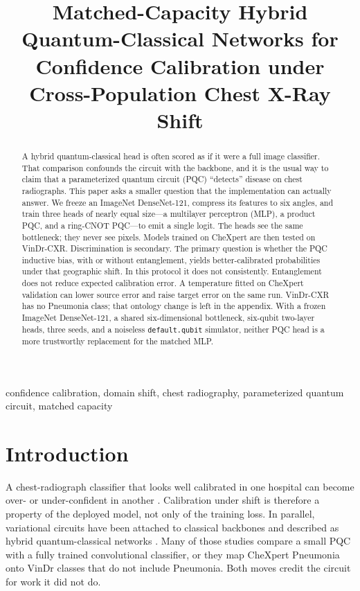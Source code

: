 \documentclass{midl} %
\title[Matched-capacity PQC heads under CXR shift]{Matched-Capacity Hybrid Quantum-Classical Networks for Confidence Calibration under Cross-Population Chest X-Ray Shift}
\begin{document}
\maketitle

\begin{abstract}
A hybrid quantum-classical head is often scored as if it were a full image classifier. That comparison confounds the circuit with the backbone, and it is the usual way to claim that a parameterized quantum circuit (PQC) ``detects'' disease on chest radiographs. This paper asks a smaller question that the implementation can actually answer. We freeze an ImageNet DenseNet-121, compress its features to six angles, and train three heads of nearly equal size---a multilayer perceptron (MLP), a product PQC, and a ring-CNOT PQC---to emit a single logit. The heads see the same bottleneck; they never see pixels. Models trained on CheXpert are then tested on VinDr-CXR. Discrimination is secondary. The primary question is whether the PQC inductive bias, with or without entanglement, yields better-calibrated probabilities under that geographic shift. In this protocol it does not consistently. Entanglement does not reduce expected calibration error. A temperature fitted on CheXpert validation can lower source error and raise target error on the same run. VinDr-CXR has no Pneumonia class; that ontology change is left in the appendix. With a frozen ImageNet DenseNet-121, a shared six-dimensional bottleneck, six-qubit two-layer heads, three seeds, and a noiseless \texttt{default.qubit} simulator, neither PQC head is a more trustworthy replacement for the matched MLP.
\end{abstract}

\begin{keywords}
confidence calibration, domain shift, chest radiography, parameterized quantum circuit, matched capacity
\end{keywords}

\section{Introduction}

A chest-radiograph classifier that looks well calibrated in one hospital can become over- or under-confident in another \cite{ovadia2019shift,zech2018variable}. Calibration under shift is therefore a property of the deployed model, not only of the training loss. In parallel, variational circuits have been attached to classical backbones and described as hybrid quantum-classical networks \cite{benedetti2019pqc,cerezo2021vqa}. Many of those studies compare a small PQC with a fully trained convolutional classifier, or they map CheXpert Pneumonia onto VinDr classes that do not include Pneumonia. Both moves credit the circuit for work it did not do.
\end{document}
